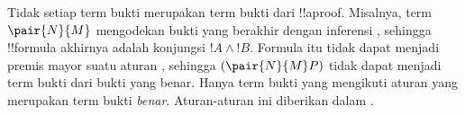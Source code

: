 \documentclass[../../../include/open-logic-section]{subfiles}
\begin{document}
Tidak setiap term bukti merupakan term bukti dari !!a{proof}. Misalnya,
term $\pair{N}{M}$ mengodekan bukti yang berakhir dengan inferensi
\Intro{\land}, sehingga !!{formula} akhirnya adalah konjungsi
$!A \land !B$. Formula itu tidak dapat menjadi premis mayor suatu aturan
\Elim{\lif}, sehingga $(\pair{N}{M}P)$ tidak dapat menjadi term bukti
dari bukti yang benar. Hanya term bukti yang mengikuti aturan
 yang merupakan term bukti \emph{benar}. Aturan-aturan ini
diberikan dalam .


\end{document}

